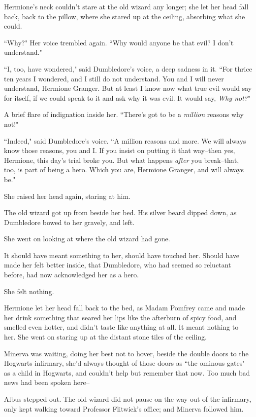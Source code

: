 Hermione's neck couldn't stare at the old wizard any longer; she let her head fall back, back to the pillow, where she stared up at the ceiling, absorbing what she could.

``Why?" Her voice trembled again. ``Why would anyone be that evil? I don't understand."

``I, too, have wondered," said Dumbledore's voice, a deep sadness in it. ``For thrice ten years I wondered, and I still do not understand. You and I will never understand, Hermione Granger. But at least I know now what true evil would say for itself, if we could speak to it and ask why it was evil. It would say, \emph{Why not?}"

A brief flare of indignation inside her. ``There's got to be a \emph{million} reasons why not!"

``Indeed," said Dumbledore's voice. ``A million reasons and more. We will always know those reasons, you and I\@. If you insist on putting it that way\---then yes, Hermione, this day's trial broke you. But what happens \emph{after} you break\---that, too, is part of being a hero. Which you are, Hermione Granger, and will always be."

She raised her head again, staring at him.

The old wizard got up from beside her bed. His silver beard dipped down, as Dumbledore bowed to her gravely, and left.

She went on looking at where the old wizard had gone.

It should have meant something to her, should have touched her. Should have made her felt better inside, that Dumbledore, who had seemed so reluctant before, had now acknowledged her as a hero.

She felt nothing.

Hermione let her head fall back to the bed, as Madam Pomfrey came and made her drink something that seared her lips like the afterburn of spicy food, and smelled even hotter, and didn't taste like anything at all. It meant nothing to her. She went on staring up at the distant stone tiles of the ceiling.

\later

Minerva was waiting, doing her best not to hover, beside the double doors to the Hogwarts infirmary, she'd always thought of those doors as ``the ominous gates" as a child in Hogwarts, and couldn't help but remember that now. Too much bad news had been spoken here\---

Albus stepped out. The old wizard did not pause on the way out of the infirmary, only kept walking toward Professor Flitwick's office; and Minerva followed him.

